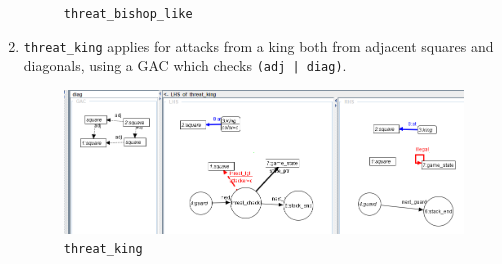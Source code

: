 \documentclass[a4paper, 10pt]{scrartcl}
\begin{document}
\begin{enumerate}
\begin{figure}[H]
            \caption{\texttt{threat\_bishop\_like}}
        \end{figure}
        \item \texttt{threat\_king} applies for attacks from a king both from adjacent squares and diagonals, using a GAC which checks \texttt{(adj | diag)}.
        \begin{figure}[H]
            \centering
            \includegraphics[width=.8\linewidth]{images/threat_king.png}
            \caption{\texttt{threat\_king}}
        \end{figure}
    \end{enumerate}
\end{document}

